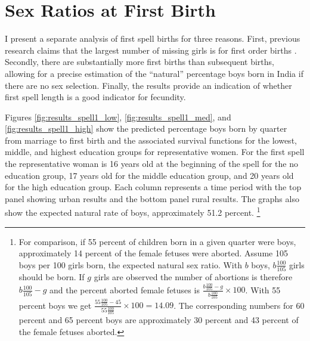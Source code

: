 \documentclass[12pt,letterpaper]{article}
\begin{document}
\clearpage
\newpage

\section{Sex Ratios at First Birth}

\setcounter{figure}{0}
\setcounter{table}{0}



I present a separate analysis of first spell births for three reasons.
First, previous research claims that the largest number of missing girls
is for first order births \citep{jha06}.
Secondly, there are substantially more first births than subsequent births, allowing
for a precise estimation of the ``natural'' percentage boys born in India if there
are no sex selection.
Finally, the results provide an indication of whether first spell length is
a good indicator for fecundity.

Figures \ref{fig:results_spell1_low}, \ref{fig:results_spell1_med}, and 
\ref{fig:results_spell1_high} show the predicted
percentage boys born by quarter from marriage to first birth and the associated
survival functions for the lowest, middle, and highest education groups for representative 
women.
For the first spell the representative woman is 16 years old at the beginning of the 
spell for the no education group, 17 years old for the middle education group, and 
20 years old for the high education group.
Each column represents a time period with the top panel showing urban results and 
the bottom panel rural results.
The graphs also show the expected natural rate of boys, approximately 51.2 percent.%
\footnote{
For comparison, if 55 percent of children born in a given quarter were boys,
approximately 14 percent of the female fetuses were aborted.
Assume 105 boys per 100 girls born, the expected natural sex ratio.
With $b$ boys,  $b\frac{100}{105}$ girls should be born.
If $g$ girls are observed the number of abortions is therefore $b\frac{100}{105}-g$
and the percent aborted female fetuses is 
$\frac{b\frac{100}{105}-g}{b\frac{100}{105}}\times 100$.
With 55 percent boys we get $\frac{55\frac{100}{105}-45}{55\frac{100}{105}}\times 100 = 14.09$.
The corresponding numbers for 60 percent and 65 percent boys are approximately 30 percent and
43 percent of the female fetuses aborted.
}
\end{document}
